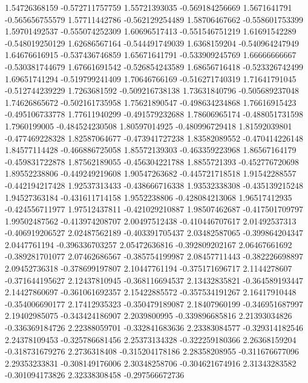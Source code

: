   1.54726368159  -0.572711757759
  1.55721393035  -0.569184256669
   1.5671641791  -0.565656755579
  1.57711442786  -0.562129254489
  1.58706467662  -0.558601753399
  1.59701492537  -0.555074252309
  1.60696517413  -0.551546751219
  1.61691542289  -0.548019250129
  1.62686567164  -0.544491749039
   1.6368159204  -0.540964247949
  1.64676616915  -0.537436746859
  1.65671641791  -0.533909245769
  1.66666666667  -0.530381744679
  1.67661691542  -0.526854243589
  1.68656716418  -0.523326742499
  1.69651741294  -0.519799241409
  1.70646766169  -0.516271740319
  1.71641791045  -0.512744239229
   1.7263681592  -0.509216738138
  1.73631840796  -0.505689237048
  1.74626865672  -0.502161735958
  1.75621890547  -0.498634234868
  1.76616915423  -0.495106733778
  1.77611940299  -0.491579232688
  1.78606965174  -0.488051731598
   1.7960199005  -0.484524230508
  1.80597014925  -0.480996729418
  1.81592039801  -0.477469228328
  1.82587064677  -0.473941727238
  1.83582089552  -0.470414226148
  1.84577114428  -0.466886725058
  1.85572139303  -0.463359223968
  1.86567164179  -0.459831722878
  1.87562189055  -0.456304221788
   1.8855721393  -0.452776720698
  1.89552238806  -0.449249219608
  1.90547263682  -0.445721718518
  1.91542288557  -0.442194217428
  1.92537313433  -0.438666716338
  1.93532338308  -0.435139215248
  1.94527363184  -0.431611714158
   1.9552238806  -0.428084213068
  1.96517412935  -0.424556711977
  1.97512437811  -0.421029210887
  1.98507462687  -0.417501709797
  1.99502487562  -0.413974208707
  2.00497512438  -0.410446707617
  2.01492537313  -0.406919206527
  2.02487562189  -0.403391705437
  2.03482587065  -0.399864204347
   2.0447761194  -0.396336703257
  2.05472636816  -0.392809202167
  2.06467661692  -0.389281701077
  2.07462686567  -0.385754199987
  2.08457711443  -0.382226698897
  2.09452736318  -0.378699197807
  2.10447761194  -0.375171696717
   2.1144278607  -0.371644195627
  2.12437810945  -0.368116694537
  2.13432835821  -0.364589193447
  2.14427860697  -0.361061692357
  2.15422885572  -0.357534191267
  2.16417910448  -0.354006690177
  2.17412935323  -0.350479189087
  2.18407960199  -0.346951687997
  2.19402985075  -0.343424186907
   2.2039800995  -0.339896685816
  2.21393034826  -0.336369184726
  2.22388059701  -0.332841683636
  2.23383084577  -0.329314182546
  2.24378109453  -0.325786681456
  2.25373134328  -0.322259180366
  2.26368159204  -0.318731679276
   2.2736318408  -0.315204178186
  2.28358208955  -0.311676677096
  2.29353233831  -0.308149176006
  2.30348258706  -0.304621674916
  2.31343283582  -0.301094173826
  2.32338308458  -0.297566672736
